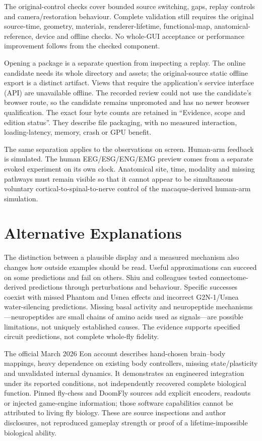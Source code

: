 The original-control checks cover bounded source switching, gaps, replay controls and camera/restoration behaviour. Complete validation still requires the original source-time, geometry, materials, renderer-lifetime, functional-map, anatomical-reference, device and offline checks. No whole-GUI acceptance or performance improvement follows from the checked component.

Opening a package is a separate question from inspecting a replay. The online candidate needs its whole directory and assets; the original-source static offline export is a distinct artifact. Views that require the application's service interface (API) are unavailable offline. The recorded review could not use the candidate's browser route, so the candidate remains unpromoted and has no newer browser qualification. The exact four byte counts are retained in ``Evidence, scope and edition status''. They describe file packaging, with no measured interaction, loading-latency, memory, crash or GPU benefit.

The same separation applies to the observations on screen. Human-arm feedback is simulated. The human EEG/\allowbreak{}ESG/\allowbreak{}ENG/\allowbreak{}EMG preview comes from a separate evoked experiment on its own clock. Anatomical site, time, modality and missing pathways must remain visible so that it cannot appear to be simultaneous voluntary cortical-to-spinal-to-nerve control of the macaque-derived human-arm simulation.

\section{Alternative Explanations}

The distinction between a plausible display and a measured mechanism also changes how outside examples should be read. Useful approximations can succeed on some predictions and fail on others. Shiu and colleagues tested connectome-derived predictions through perturbations and behaviour. Specific successes coexist with missed Phantom and Usnea effects and incorrect G2N-1/Usnea water-silencing predictions. Missing basal activity and neuropeptide mechanisms---neuropeptides are small chains of amino acids used as signals---are possible limitations, not uniquely established causes. The evidence supports specified circuit predictions, not complete whole-fly fidelity.\citep{shiu2024}

The official March 2026 Eon account describes hand-chosen brain--body mappings,
heavy dependence on existing body controllers, missing state/plasticity and
unvalidated internal dynamics. It demonstrates an engineered integration under
its reported conditions, not independently recovered complete biological
function.\citep{eon2026} Pinned fly-chess and DoomFly sources add explicit
encoders, readouts or injected game-engine information; those software
capabilities cannot be attributed to living fly biology.\citep{flychess,doomfly}
These are source inspections and author disclosures, not reproduced gameplay
strength or proof of a lifetime-impossible biological ability.

